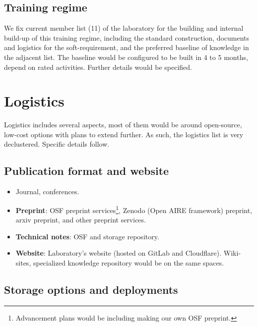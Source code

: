 \documentclass[9pt,a4paper]{article}
\begin{document}
\subsection{Training regime}

We fix current member list (11) of the laboratory for the building and internal build-up of this training regime, including the standard construction, documents and logistics for the soft-requirement, and the preferred baseline of knowledge in the adjacent list. The baseline would be configured to be built in 4 to 5 months, depend on rated activities. Further details would be specified. 


\section{Logistics}

Logistics includes several aspects, most of them would be around open-source, low-cost options with plans to extend further. As such, the logistics list is very declustered. Specific details follow. 

\subsection{Publication format and website}

\begin{itemize}
    \item Journal, conferences. 
    \item \textbf{Preprint}: OSF preprint services\footnote{Advancement plans would be including making our own OSF preprint.}, Zenodo (Open AIRE framework) preprint, \textsf{arxiv} preprint, and other preprint services. 
    \item \textbf{Technical notes}: OSF and storage repository. 
    \item \textbf{Website}: Laboratory's website (hosted on GitLab and Cloudflare). Wiki-sites, specialized knowledge repository would be on the same spaces. 
\end{itemize}

\subsection{Storage options and deployments}
\end{document}
